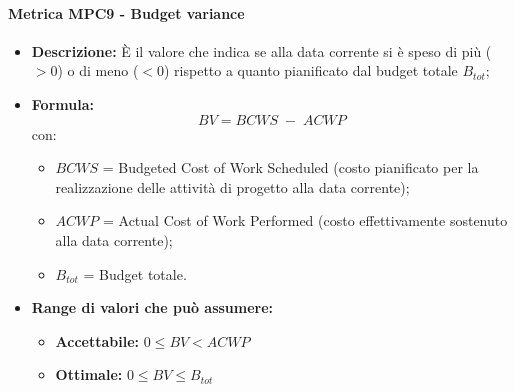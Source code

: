     \paragraph{Metrica MPC9 - Budget variance}
        \begin{itemize}
            \item \textbf{Descrizione:} È il valore che indica se alla data corrente si è speso di più ($>0$) o di meno ($<0$) rispetto a quanto pianificato dal budget totale $B_{tot}$;
            \item \textbf{Formula:} $$BV = {BCWS \; - \; ACWP}$$
            con:
            \begin{itemize}
                \item $BCWS$ = Budgeted Cost of Work Scheduled (costo pianificato per la realizzazione delle attività di progetto alla data corrente);
                \item $ACWP$ = Actual Cost of Work Performed (costo effettivamente sostenuto alla data corrente);
                \item $B_{tot}$ = Budget totale.
            \end{itemize}
            \item \textbf{Range di valori che può assumere:}
            \begin{itemize}
                \item \textbf{Accettabile:} $0 \leq BV < ACWP$
                \item \textbf{Ottimale:} $0 \leq BV \leq B_{tot}$
            \end{itemize}
        \end{itemize}

\newpage %

